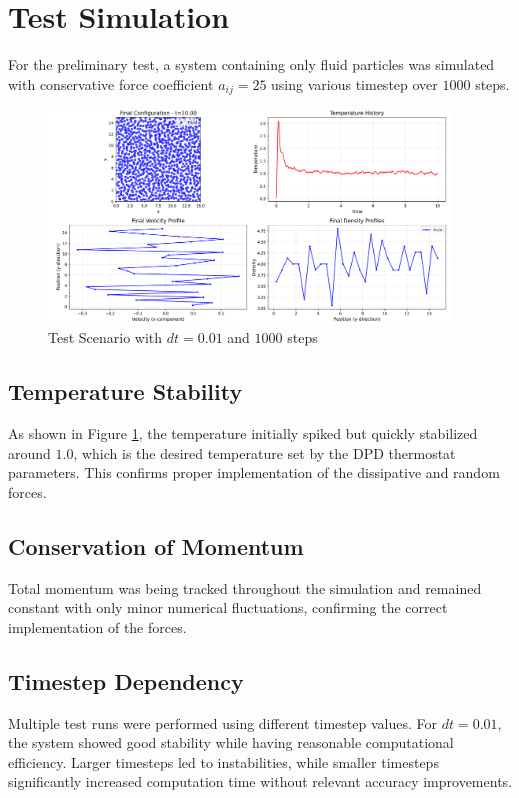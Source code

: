 \section{Test Simulation}
For the preliminary test, a system containing only fluid particles was simulated with conservative force coefficient $a_{ij} = 25$ using various timestep over $1000$ steps.
\begin{figure}[H]
	\begin{center}
		\includegraphics[width=0.95\textwidth]{figures/test_final_vis.png}
	\end{center}
	\caption{Test Scenario with $dt = 0.01$ and $1000$ steps}\label{fig:test}
\end{figure}
\subsection{Temperature Stability}
As shown in Figure \ref{fig:test}, the temperature initially spiked but quickly stabilized around $1.0$, which is the desired temperature set by the DPD thermostat parameters. This confirms proper implementation of the dissipative and random forces.
\subsection{Conservation of Momentum}
Total momentum was being tracked throughout the simulation and remained constant with only minor numerical fluctuations, confirming the correct implementation of the forces.
\subsection{Timestep Dependency}
Multiple test runs were performed using different timestep values. For $dt = 0.01$, the system showed good stability while having reasonable computational efficiency. Larger timesteps led to instabilities, while smaller timesteps significantly increased computation time without relevant accuracy improvements. 

